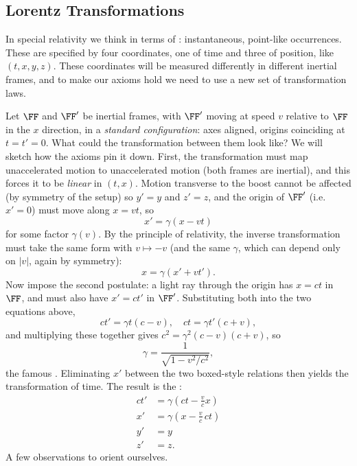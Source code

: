\documentclass[a4paper]{scrartcl}
\begin{document}
\subsection{Lorentz Transformations}

In special relativity we think in terms of : instantaneous, point-like occurrences. These are specified by four coordinates, one of time and three of position, like $(t, x, y, z)$.
These coordinates will be measured differently in different inertial frames, and to make our axioms hold we need to use a new set of transformation laws.

Let $\FF$ and $\FF'$ be inertial frames, with $\FF'$ moving at speed $v$ relative to $\FF$ in the $x$ direction, in a \emph{standard configuration}: axes aligned, origins coinciding at $t = t' = 0$. What could the transformation between them look like? We will sketch how the axioms pin it down. First, the transformation must map unaccelerated motion to unaccelerated motion (both frames are inertial), and this forces it to be \emph{linear} in $(t, x)$. Motion transverse to the boost cannot be affected (by symmetry of the setup) so $y' = y$ and $z' = z$, and the origin of $\FF'$ (i.e.\ $x' = 0$) must move along $x = vt$, so
$$
x' = \gamma (x - vt)
$$
for some factor $\gamma(v)$. By the principle of relativity, the inverse transformation must take the same form with $v \mapsto -v$ (and the same $\gamma$, which can depend only on $|v|$, again by symmetry):
$$
x = \gamma(x' + vt').
$$
Now impose the second postulate: a light ray through the origin has $x = ct$ in $\FF$, and must also have $x' = ct'$ in $\FF'$. Substituting both into the two equations above,
$$
ct' = \gamma t (c - v), \quad ct = \gamma t'(c + v),
$$
and multiplying these together gives $c^2 = \gamma^2 (c - v)(c + v)$, so
$$
\gamma = \frac{1}{\sqrt{1 - v^2/c^2}},
$$
the famous . Eliminating $x'$ between the two boxed-style relations then yields the transformation of time. The result is the :
\begin{align*}
	ct' &= \gamma\left(ct - \frac{v}{c}x\right) \\
	x' &= \gamma \left(x - \frac{v}{c}\, ct\right) \\
	y' &= y \\
	z' &= z.
\end{align*}
A few observations to orient ourselves.
\end{document}
